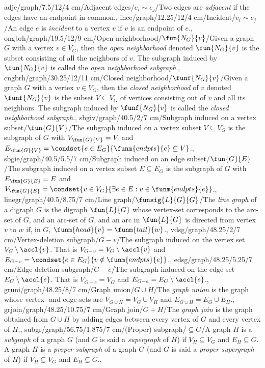 adje/graph/7.5/12/4 cm/{Adjacent edges}/{$e_i\sim e_j$}/{Two edges are \emph{adjacent} if the edges have an endpoint in common.},
ince/graph/12.25/12/4 cm/{Incident}/{$v_i\sim e_j$}/{An edge $e$ is \emph{incident} to a vertex $v$ if $v$ is an endpoint of $e$.},
ongbrh/graph/19.5/12/9 cm/{Open neighborhood}/{$\fun{N_G}{v}$}/{Given a graph $G$ with a vertex $v\in V_G$, then the \emph{open neighborhood} denoted $\fun{N_G}{v}$ is the subset consisting of all the neighbors of $v$. The subgraph induced by $\fun{N_G}{v}$ is called the \emph{open neighborhood subgraph}.},
cngbrh/graph/30.25/12/11 cm/{Closed neighborhood}/{$\funf{N_G}{v}$}/{Given a graph $G$ with a vertex $v\in V_G$, then the \emph{closed neighborhood} of $v$ denoted $\funf{N_G}{v}$ is the subset $V\subseteq V_G$ of vertices consisting out of $v$ and all its neighbors. The subgraph induced by $\funf{N_G}{v}$ is called the \emph{closed neighborhood subgraph}.},
sbgiv/graph/40.5/2/7 cm/{Subgraph induced on a vertex subset}/{$\fun{G}{V}$}/{The subgraph induced on a vertex subset $V\subseteq V_G$ is the subgraph of $G$ with $V_{\fun{G}{V}}=V$ and $E_{\fun{G}{V}}=\condset{e\in E_G}{\funm{endpts}{e}\subseteq V}$.},
sbgie/graph/40.5/5.5/7 cm/{Subgraph induced on an edge subset}/{$\fun{G}{E}$}/{The subgraph induced on a vertex subset $E\subseteq E_G$ is the subgraph of $G$ with $E_{\fun{G}{E}}=E$ and $V_{\fun{G}{E}}=\condset{v\in V_G}{\exists e\in E:v\in\funm{endpts}{e}}$.},
linegr/graph/40.5/8.75/7 cm/{Line graph}/{$\funsig{L}{G}{G}$}/{The \emph{line graph} of a digraph $G$ is the digraph $\fun{L}{G}$ whose vertex-set corresponds to the arc-set of $G$, and an arc-set of $G$, and an arc in $\fun{L}{G}$ is directed from vertex $v$ to $w$ if, in $G$, $\funm{head}{v}=\funm{tail}{w}$.},%
vdsg/graph/48.25/2/7 cm/{Vertex-deletion subgraph}/{$G-v$}/{The subgraph induced on the vertex set $V_G\setminus\accl{v}$. That is $V_{G-v}=V_G\setminus\accl{v}$ and $E_{G-v}=\condset{e\in E_G}{v\notin\funm{endpts}{e}}$.},%
edsg/graph/48.25/5.25/7 cm/{Edge-deletion subgraph}/{$G-e$}/{The subgraph induced on the edge set $E_G\setminus\accl{e}$. That is $V_{G-e}=V_G$ and $E_{G-e}=E_G\setminus\accl{e}$.},%
gruni/graph/48.25/8/7 cm/{Graph union}/{$G\cup H$}/{The \emph{graph union} is the graph whose vertex- and edge-sets are $V_{G\cup H}=V_G\cup V_H$ and $E_{G\cup H}=E_G\cup E_H$.},%
grjoin/graph/48.25/10.75/7 cm/{Graph join}/{$G+H$}/{The \emph{graph join} is the graph obtained from $G\cup H$ by adding edges between every vertex of $G$ and every vertex of $H$.},%
subgr/graph/56.75/1.875/7 cm/{(Proper) subgraph}/{$\subseteq G$}/{A graph $H$ is a \emph{subgraph} of a graph $G$ (and $G$ is said a \emph{supergraph} of $H$) if $V_H\subseteq V_G$ and $E_H\subseteq G$. A graph $H$ is a \emph{proper subgraph} of a graph $G$ (and $G$ is said a \emph{proper supergraph} of $H$) if $V_H\subsetneq V_G$ and $E_H\subsetneq G$.},
